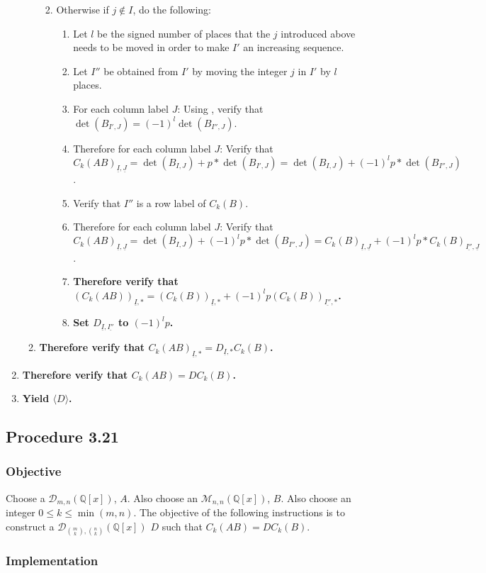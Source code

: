 \documentclass[twocolumn]{article}
\newcommand{\ul}[1]{\underline{#1}}
\newcommand{\procedure}[2][]{\subsection*{Procedure #2 \ifthenelse{\equal{#1}{}}{}{(#1)}}\label{sec:procedure #2}}
\newcommand{\objective}{\subsubsection*{Objective}}
\newcommand{\implementation}{\subsubsection*{Implementation}}
\newcommand{\procedurehr}[2][]{\hyperref[sec:procedure #2]{\ifthenelse{\equal{#1}{}}{procedure #2}{#1}}}
\begin{document}
\begin{enumerate}
\begin{enumerate}
\begin{enumerate}
\begin{enumerate}
							\end{enumerate}
							\item Otherwise if $j\notin I$, do the following:
							\begin{enumerate}
								\item Let $l$ be the signed number of places that the $j$ introduced above needs to be moved in order to make $I'$ an increasing sequence.
								\item Let $I''$ be obtained from $I'$ by moving the integer $j$ in $I'$ by $l$ places.
								\item For each column label $J$: Using \procedurehr{3.18}, verify that $\det(B_{I',J})=(-1)^l\det(B_{I'',J})$.
								\item Therefore for each column label $J$: Verify that ${C_k(AB)}_{\ul{I},\ul{J}}=\det(B_{I,J})+p*\det(B_{I',J})=\det(B_{I,J})+(-1)^lp*\det(B_{I'',J})$.
								\item Verify that $I''$ is a row label of $C_k(B)$.
								\item Therefore for each column label $J$: Verify that ${C_k(AB)}_{\ul{I},\ul{J}}=\det(B_{I,J})+(-1)^lp*\det(B_{I'',J})={C_k(B)}_{\ul{I},\ul{J}}+(-1)^lp*{C_k(B)}_{\ul{I''},\ul{J}}$.
								\item \textbf{Therefore verify that $(C_k(AB))_{\ul{I},*}=(C_k(B))_{\ul{I},*}+(-1)^lp(C_k(B))_{\ul{I''},*}$.}
								\item \textbf{Set $D_{\ul{I},\ul{I''}}$ to $(-1)^lp$.}
							\end{enumerate}
						\end{enumerate}
						\item \textbf{Therefore verify that ${C_k(AB)}_{\ul{I},*}=D_{\ul{I},*}C_k(B)$.}
					\end{enumerate}
					\item \textbf{Therefore verify that $C_k(AB)=DC_k(B)$.}
					\item \textbf{Yield $\langle D\rangle$.}
				\end{enumerate}
		\procedure{3.21}
			\objective
				Choose a $\mathcal{D}_{m,n}(\mathbb{Q}[x])$, $A$. Also choose an $\mathcal{M}_{n,n}(\mathbb{Q}[x])$, $B$. Also choose an integer $0\le k\le\min(m,n)$. The objective of the following instructions is to construct a $\mathcal{D}_{\binom{m}{k},\binom{n}{k}}(\mathbb{Q}[x])$ $D$ such that $C_k(AB)=DC_k(B)$.
			\implementation
\end{document}
